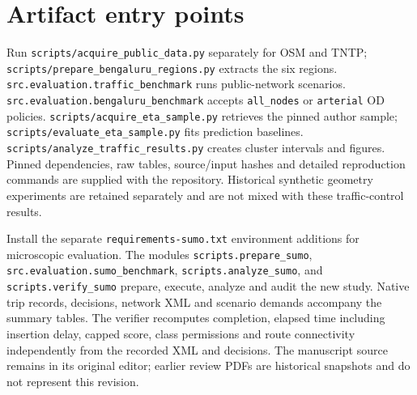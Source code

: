 \documentclass[sigconf,anonymous,review]{acmart}
\begin{document}
\appendix
\section{Artifact entry points}
Run \texttt{scripts/acquire\_public\_data.py} separately for OSM and TNTP; \texttt{scripts/prepare\_bengaluru\_regions.py} extracts the six regions. \texttt{src.evaluation.traffic\_benchmark} runs public-network scenarios. \texttt{src.evaluation.bengaluru\_benchmark} accepts \texttt{all\_nodes} or \texttt{arterial} OD policies. \texttt{scripts/acquire\_eta\_sample.py} retrieves the pinned author sample; \texttt{scripts/evaluate\_eta\_sample.py} fits prediction baselines. \texttt{scripts/analyze\_traffic\_results.py} creates cluster intervals and figures. Pinned dependencies, raw tables, source/input hashes and detailed reproduction commands are supplied with the repository. Historical synthetic geometry experiments are retained separately and are not mixed with these traffic-control results.

Install the separate \texttt{requirements-sumo.txt} environment additions for microscopic evaluation. The modules \texttt{scripts.prepare\_sumo}, \texttt{src.evaluation.sumo\_benchmark}, \texttt{scripts.analyze\_sumo}, and \texttt{scripts.verify\_sumo} prepare, execute, analyze and audit the new study. Native trip records, decisions, network XML and scenario demands accompany the summary tables. The verifier recomputes completion, elapsed time including insertion delay, capped score, class permissions and route connectivity independently from the recorded XML and decisions. The manuscript source remains in its original editor; earlier review PDFs are historical snapshots and do not represent this revision.
\end{document}
